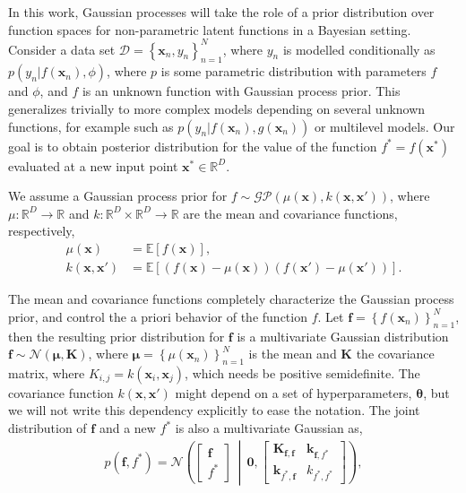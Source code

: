 \documentclass[]{interact}
\theoremstyle{plain}%
\theoremstyle{definition}
\theoremstyle{remark}
\begin{document}
In this work, Gaussian processes will take the role of a prior distribution over function spaces for non-parametric latent functions in a Bayesian setting. 
Consider a data set $\mathcal{D} = \left\lbrace \bm{x}_n, y_n \right\rbrace_{n=1}^N$, where $y_n$ is modelled conditionally as $p(y_n|f(\bm{x}_n),\phi)$, where $p$ is some parametric distribution with parameters $f$ and $\phi$, and $f$ is an unknown function with Gaussian process prior. This generalizes trivially to more complex models depending on several unknown functions, for example such as $p(y_n|f(\bm{x}_n),g(\bm{x}_n))$ or multilevel models. Our goal is to obtain posterior distribution for the value of the function $f^*=f(\bm{x}^*)$  evaluated at a new input point $\bm{x}^* \in \mathbb{R}^D$.

We assume a Gaussian process prior for $f \sim \mathcal{GP}(\mu(\bm{x}), k(\bm{x}, \bm{x}'))$, where $\mu: \mathbb{R}^D \rightarrow \mathbb{R}$ and $k: \mathbb{R}^D \times \mathbb{R}^D \rightarrow \mathbb{R}$ are the mean and covariance functions, respectively,
%
\begin{align*}
 	\mu(\bm{x}) &= \mathbb{E}\!\left[f(\bm{x})\right],\\ 
 	k(\bm{x}, \bm{x}') &= \mathbb{E}\!\left[\left( f(\bm{x}) - \mu(\bm{x}) \right)\left( f(\bm{x}') - \mu(\bm{x}') \right)\right].
\end{align*} 

The mean and covariance functions completely characterize the Gaussian process prior, and control the a priori behavior of the function $f$. Let $\bm{f}=\left\lbrace f(\bm{x}_n) \right\rbrace_{n=1}^N$, then the resulting prior distribution for $\bm{f}$ is a multivariate Gaussian distribution
$\bm{f} \sim \mathcal{N}(\bm{\mu}, \bm{K})$,
 where $\bm{\mu} = \left\lbrace \mu(\bm{x}_n) \right\rbrace_{n=1}^N$ is the mean and $\bm{K}$ the covariance matrix, where $K_{i,j}=k(\bm{x}_i,\bm{x}_j)$, which needs be positive semidefinite. The covariance function $k(\bm{x}, \bm{x}')$ might depend on a set of hyperparameters, $\bm{\theta}$, but we will not write this dependency explicitly to ease the notation.
The joint distribution of $\bm{f}$ and a new $f^*$ is also a multivariate Gaussian as,
%
\begin{align*}
p(\bm{f}, f^*)=\mathcal{N} \left( \left[ \begin{array}{cc}
\bm{f} \\ 
f^*
\end{array} \right] \,\middle|\, \bm{0},\left[ \begin{array}{cc}
\bm{K}_{\bm{f},\bm{f}} & \bm{k}_{\bm{f},f^*} \\ 
\bm{k}_{f^*,\bm{f}} & k_{f^*,f^*}
\end{array} \right] \right),
\end{align*} 
\end{document}
